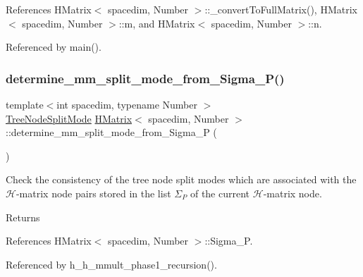 References H\+Matrix$<$ spacedim, Number $>$\+::\+\_\+convert\+To\+Full\+Matrix(), H\+Matrix$<$ spacedim, Number $>$\+::m, and H\+Matrix$<$ spacedim, Number $>$\+::n.



Referenced by main().

\mbox{\label{classHMatrix_a6f24998c7de1d0e336577be41c6281e3}} 
\subsubsection{\texorpdfstring{determine\+\_\+mm\+\_\+split\+\_\+mode\+\_\+from\+\_\+\+Sigma\+\_\+\+P()}{determine\_mm\_split\_mode\_from\_Sigma\_P()}}
{\footnotesize\ttfamily template$<$int spacedim, typename Number $>$ \\
\hyperlink{tree_8h_a922ca07db9633957939f697a65aff11d}{Tree\+Node\+Split\+Mode} \hyperlink{classHMatrix}{H\+Matrix}$<$ spacedim, Number $>$\+::determine\+\_\+mm\+\_\+split\+\_\+mode\+\_\+from\+\_\+\+Sigma\+\_\+P (\begin{DoxyParamCaption}{ }\end{DoxyParamCaption})}

Check the consistency of the tree node split modes which are associated with the $\mathcal{H}$-\/matrix node pairs stored in the list $\Sigma_P$ of the current $\mathcal{H}$-\/matrix node. \begin{DoxyReturn}{Returns}

\end{DoxyReturn}


References H\+Matrix$<$ spacedim, Number $>$\+::\+Sigma\+\_\+P.



Referenced by h\+\_\+h\+\_\+mmult\+\_\+phase1\+\_\+recursion().

\mbox{\label{classHMatrix_a66979dbdf56155c63f0706649e8545b9}} 
